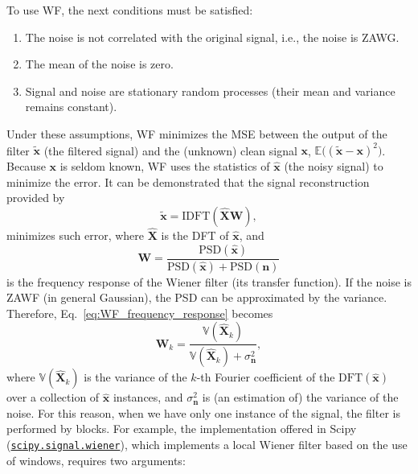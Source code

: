 \documentclass{article}
\begin{document}
To use WF, the next conditions must be satisfied:
\begin{enumerate}
\item The noise is not correlated with the original signal, i.e., the
  noise is ZAWG.
\item The mean of the noise is zero.
\item Signal and noise are stationary random processes (their mean and
  variance remains constant).
\end{enumerate}

Under these assumptions, WF minimizes the MSE between the output of
the filter $\tilde{\mathbf{x}}$ (the filtered signal) and the
(unknown) clean signal $\mathbf{x}$,
$\mathbb{E}\big((\tilde{\mathbf{x}} - \mathbf{x})^2\big)$.  Because
$\mathbf{x}$ is seldom known, WF uses the statistics of
$\hat{\mathbf{x}}$ (the noisy signal) to minimize the error. It can be demonstrated \cite{wiener1942extrapolation} that the signal reconstruction provided by
\begin{equation}
  \tilde{\mathbf{x}} = \text{IDFT}(\hat{\mathbf{X}}\mathbf{W}),
  \label{eq:WF}
\end{equation}
minimizes such error, where $\hat{\mathbf{X}}$ is the DFT of $\hat{\mathbf{x}}$, and
\begin{equation}
  \mathbf{W} = \frac{\text{PSD}(\hat{\mathbf{x}})}{\text{PSD}(\hat{\mathbf{x}}) + \text{PSD}(\mathbf{n})}
  \label{eq:WF_frequency_response}
\end{equation}
is the frequency response of the Wiener filter (its transfer
function). If the noise is ZAWF (in general Gaussian), the PSD can be
approximated by the variance. Therefore,
Eq.~\ref{eq:WF_frequency_response} becomes
\begin{equation}
  \mathbf{W}_k = \frac{\mathbb{V}(\hat{\mathbf{X}}_k)}{\mathbb{V}(\hat{\mathbf{X}}_k) + \sigma^2_{\mathbf{n}}},
  \label{eq:WF_coeffs}
\end{equation}
where $\mathbb{V}(\hat{\mathbf{X}}_k)$ is the variance of the $k$-th
Fourier coefficient of the $\text{DFT}(\hat{\mathbf{x}})$ over a
collection of $\hat{\mathbf{x}}$ instances, and
$\sigma^2_{\mathbf{n}}$ is (an estimation of) the variance of the
noise. For this reason, when we have only one instance of the signal,
the filter is performed by blocks. For example, the implementation
offered in Scipy
(\href{https://docs.scipy.org/doc/scipy/reference/generated/scipy.signal.wiener.html}{\texttt{scipy.signal.wiener}}),
which implements a local Wiener filter based on the use of windows,
requires two arguments:
\end{document}
